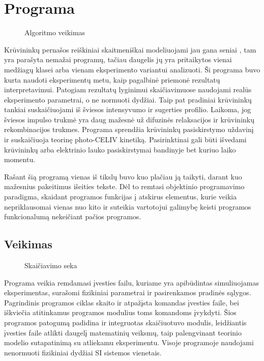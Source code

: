  
\section{Programa}

\begin{figure}
\centering

\caption{Algoritmo veikimas}
  \label{fig:algoritmas}
\end{figure}

Krūvininkų pernašos reiškiniai skaitmeniškai modeliuojami jau gana seniai \cite{juška:4946}, tam yra parašyta nemažai programų, tačiau daugelis jų yra pritaikytos vienai medžiagų klasei arba vienam eksperimento variantui analizuoti. Ši programa buvo kurta naudoti eksperimentų metu, kaip pagalbinė priemonė rezultatų interpretavimui. Patogiam rezultatų lyginimui skaičiavimuose naudojami realūs eksperimento parametrai, o ne normuoti dydžiai. Taip pat pradiniai krūvininkų tankiai suskaičiuojami iš šviesos intensyvumo ir sugerties profilio. Laikoma, jog šviesos impulso trukmė yra daug mažesnė už difuzinės relaksacijos ir krūvininkų rekombinacijos trukmes. Programa sprendžia krūvininkų pasiskirstymo uždavinį ir suskaičiuoja teorinę photo-CELIV kinetiką. Pasirinktinai gali būti išvedami krūvininkų arba elektrinio lauko pasiskirstymai bandinyje bet kuriuo laiko momentu.

Rašant šią programą vienas iš tikslų buvo kuo plačiau ją taikyti, darant kuo mažesnius pakeitimus išeities tekste. Dėl to remtasi objektinio programavimo paradigma, skaidant programos funkcijas į atskirus elementus, kurie veikia nepriklausomai vienas nuo kito ir suteikia vartotojui galimybę keisti programos funkcionalumą nekeičiant pačios programos.
\subsection{Veikimas}

\begin{figure}
  \begin{center}
	
  \end{center}
  \caption{Skaičiavimo seka}
  \label{fig:skaičiavimas}
\end{figure}

Programa veikia remdamasi įvesties failu, kuriame yra apibūdintas simuliuojamas eksperimentas, surašomi fizikiniai parametrai ir pasirenkamos pradinės sąlygos. Pagrindinis programos ciklas skaito ir atpažįsta komandas įvesties faile, bei iškviečia atitinkamus programos modulius toms komandoms įvykdyti. Šios programos patogumą padidina ir integruotas skaičiuotuvo modulis, leidžiantis įvesties faile atlikti daugelį matematinių veiksmų, taip palengvinant teorinio modelio sutapatinimą su atliekamu eksperimentu.
Visoje programoje naudojami nenormuoti fizikiniai dydžiai SI sistemos vienetais.
